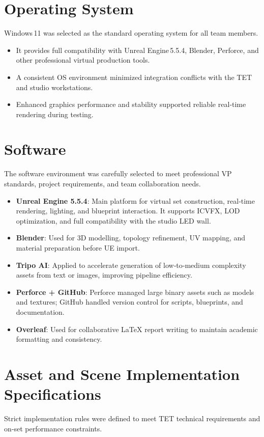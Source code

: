 \documentclass[12pt,a4paper]{report}
\begin{document}
\section{Operating System}
Windows 11 was selected as the standard operating system for all team members.

\begin{itemize}
    \item It provides full compatibility with Unreal Engine 5.5.4, Blender, Perforce, and other professional virtual production tools.
    \item A consistent OS environment minimized integration conflicts with the TET and studio workstations.
    \item Enhanced graphics performance and stability supported reliable real‑time rendering during testing.
\end{itemize}

\section{Software}
The software environment was carefully selected to meet professional VP standards, project requirements, and team collaboration needs.

\begin{itemize}
    \item \textbf{Unreal Engine 5.5.4}: Main platform for virtual set construction, real‑time rendering, lighting, and blueprint interaction. It supports ICVFX, LOD optimization, and full compatibility with the studio LED wall.
    \item \textbf{Blender}: Used for 3D modelling, topology refinement, UV mapping, and material preparation before UE import.
    \item \textbf{Tripo AI}: Applied to accelerate generation of low‑to‑medium complexity assets from text or images, improving pipeline efficiency.
    \item \textbf{Perforce + GitHub}: Perforce managed large binary assets such as models and textures; GitHub handled version control for scripts, blueprints, and documentation.
    \item \textbf{Overleaf}: Used for collaborative LaTeX report writing to maintain academic formatting and consistency.
\end{itemize}

\section{Asset and Scene Implementation Specifications}
Strict implementation rules were defined to meet TET technical requirements and on‑set performance constraints.
\end{document}

